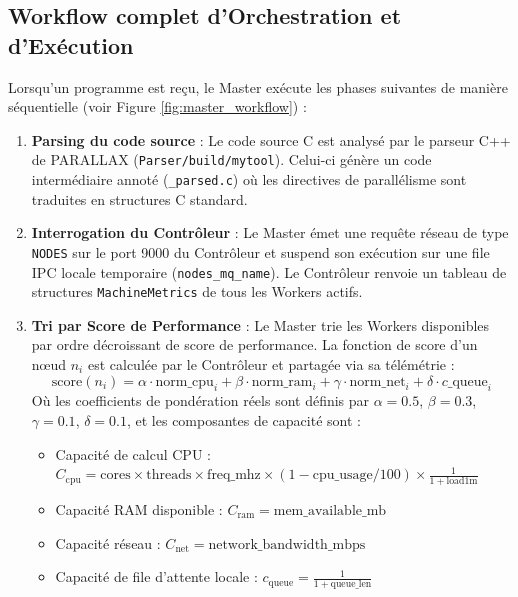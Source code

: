 \documentclass[12pt,a4paper]{report}
\begin{document}
\subsection{Workflow complet d'Orchestration et d'Exécution}

Lorsqu'un programme est reçu, le Master exécute les phases suivantes de manière séquentielle (voir Figure \ref{fig:master_workflow}) :

\begin{enumerate}
    \item \textbf{Parsing du code source} : Le code source C est analysé par le parseur C++ de PARALLAX (\texttt{Parser/build/mytool}). Celui-ci génère un code intermédiaire annoté (\texttt{\_parsed.c}) où les directives de parallélisme sont traduites en structures C standard.
    \item \textbf{Interrogation du Contrôleur} : Le Master émet une requête réseau de type \texttt{NODES} sur le port 9000 du Contrôleur et suspend son exécution sur une file IPC locale temporaire (\texttt{nodes\_mq\_name}). Le Contrôleur renvoie un tableau de structures \texttt{MachineMetrics} de tous les Workers actifs.
    \item \textbf{Tri par Score de Performance} : Le Master trie les Workers disponibles par ordre décroissant de score de performance. La fonction de score d'un nœud $n_i$ est calculée par le Contrôleur et partagée via sa télémétrie :
        \begin{equation}
            \text{score}(n_i) = \alpha \cdot \text{norm\_cpu}_i + \beta \cdot \text{norm\_ram}_i + \gamma \cdot \text{norm\_net}_i + \delta \cdot c\text{\_queue}_i
        \end{equation}
        Où les coefficients de pondération réels sont définis par $\alpha = 0.5$, $\beta = 0.3$, $\gamma = 0.1$, $\delta = 0.1$, et les composantes de capacité sont :
        \begin{itemize}
            \item Capacité de calcul CPU : $C_{\text{cpu}} = \text{cores} \times \text{threads} \times \text{freq\_mhz} \times (1 - \text{cpu\_usage}/100) \times \frac{1}{1 + \text{load1m}}$
            \item Capacité RAM disponible : $C_{\text{ram}} = \text{mem\_available\_mb}$
            \item Capacité réseau : $C_{\text{net}} = \text{network\_bandwidth\_mbps}$
            \item Capacité de file d'attente locale : $c_{\text{queue}} = \frac{1}{1 + \text{queue\_len}}$

\end{itemize}
\end{enumerate}
\end{document}
